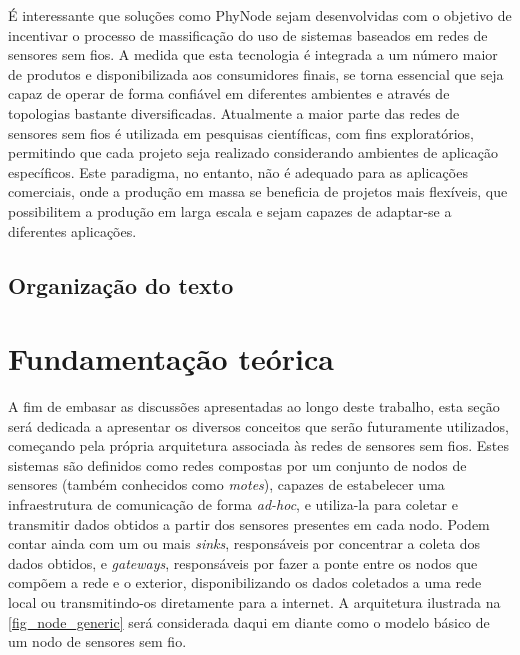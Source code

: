 \documentclass[
	12pt,				%
	openright,			%
	oneside,
	a4paper,			%
	english,			%
	french,				%
	spanish,			%
	brazil				%
	]{abntex2}
\begin{document}
É interessante que soluções como PhyNode sejam desenvolvidas com o objetivo de incentivar o processo de massificação do uso de sistemas baseados em redes de sensores sem fios. A medida que esta tecnologia é integrada a um número maior de produtos e disponibilizada aos consumidores finais, se torna essencial que seja capaz de operar de forma confiável em diferentes ambientes e através de topologias bastante diversificadas. Atualmente a maior parte das redes de sensores sem fios é utilizada em pesquisas científicas, com fins exploratórios, permitindo que cada projeto seja realizado considerando ambientes de aplicação específicos. Este paradigma, no entanto, não é adequado para as aplicações comerciais, onde a produção em massa se beneficia de projetos mais flexíveis, que possibilitem a produção em larga escala e sejam capazes de adaptar-se a diferentes aplicações.

\section{Organização do texto}

\chapter{Fundamentação teórica}
A fim de embasar as discussões apresentadas ao longo deste trabalho, esta seção será dedicada a apresentar os diversos conceitos que serão futuramente utilizados, começando pela própria arquitetura associada às redes de sensores sem fios. Estes sistemas são definidos como redes compostas por um conjunto de nodos de sensores (também conhecidos como \textit{motes}), capazes de estabelecer uma infraestrutura de comunicação de forma \textit{ad-hoc}, e utiliza-la para coletar e transmitir dados obtidos a partir dos sensores presentes em cada nodo. Podem contar ainda com um ou mais \textit{sinks}, responsáveis por concentrar a coleta dos dados obtidos, e \textit{gateways}, responsáveis por fazer a ponte entre os nodos que compõem a rede e o exterior, disponibilizando os dados coletados a uma rede local ou transmitindo-os diretamente para a internet. A arquitetura ilustrada na \autoref{fig_node_generic} será considerada daqui em diante como o modelo básico de um nodo de sensores sem fio. 
\end{document}
